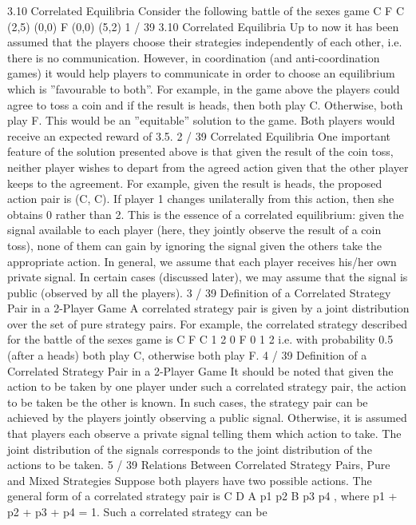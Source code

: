 3.10 Correlated Equilibria
Consider the following battle of the sexes game
C F
C (2,5) (0,0)
F (0,0) (5,2)
1 / 39
3.10 Correlated Equilibria
Up to now it has been assumed that the players choose their
strategies independently of each other, i.e. there is no
communication.
However, in coordination (and anti-coordination games) it would
help players to communicate in order to choose an equilibrium
which is ”favourable to both”.
For example, in the game above the players could agree to toss a
coin and if the result is heads, then both play C. Otherwise, both
play F.
This would be an ”equitable” solution to the game. Both players
would receive an expected reward of 3.5.
2 / 39
Correlated Equilibria
One important feature of the solution presented above is that given
the result of the coin toss, neither player wishes to depart from the
agreed action given that the other player keeps to the agreement.
For example, given the result is heads, the proposed action pair is
(C, C). If player 1 changes unilaterally from this action, then she
obtains 0 rather than 2.
This is the essence of a correlated equilibrium: given the signal
available to each player (here, they jointly observe the result of a
coin toss), none of them can gain by ignoring the signal given the
others take the appropriate action.
In general, we assume that each player receives his/her own private
signal. In certain cases (discussed later), we may assume that the
signal is public (observed by all the players).
3 / 39
Definition of a Correlated Strategy Pair in a 2-Player Game
A correlated strategy pair is given by a joint distribution over the
set of pure strategy pairs. For example, the correlated strategy
described for the battle of the sexes game is
C F
C
1
2
0
F 0
1
2
i.e. with probability 0.5 (after a heads) both play C, otherwise
both play F.
4 / 39
Definition of a Correlated Strategy Pair in a 2-Player Game
It should be noted that given the action to be taken by one player
under such a correlated strategy pair, the action to be taken be the
other is known. In such cases, the strategy pair can be achieved by
the players jointly observing a public signal.
Otherwise, it is assumed that players each observe a private signal
telling them which action to take. The joint distribution of the
signals corresponds to the joint distribution of the actions to be
taken.
5 / 39
Relations Between Correlated Strategy Pairs, Pure and
Mixed Strategies
Suppose both players have two possible actions. The general form
of a correlated strategy pair is
C D
A p1 p2
B p3 p4
, where p1 + p2 + p3 + p4 = 1. Such a correlated strategy can be
